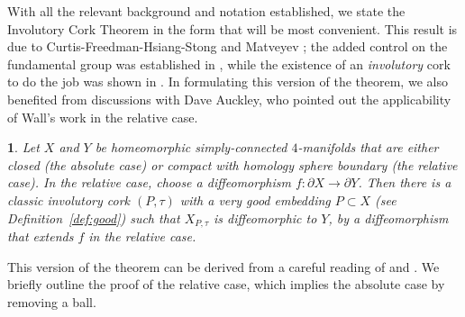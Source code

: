 \documentclass[11pt]{amsart}
\newcommand{\thistheoremname}{}
\newtheorem{genericthm}[theorem]{\thistheoremname}
\newenvironment{namedtheorem}[1]
  {\renewcommand{\thistheoremname}{#1}%
   \begin{genericthm}}
  {\end{genericthm}}
\theoremstyle{definition}
\newcommand{\defref}[1]{Definition~\ref{#1}}
\newcommand{\bj}{\mathbb J}
\newcommand{\bl}{\mathbb L}
\newcommand{\id}{\textup{id}}
\newcommand{\del}{\partial}
\newcommand{\ac}{\textup{AC}}
\newcommand{\bcs}{\mathop\natural}
\newcommand{\bsum}{C_1\bcs \cdots \bcs C_{n}}
\newcommand{\pw}{\textup{PW}}
\begin{document}

With all the relevant background and notation established, we state the Involutory Cork Theorem in the form that will be most convenient. This result is due to Curtis-Freedman-Hsiang-Stong \cite{curtis-freedman-hsiang-stong} and Matveyev \cite{matveyev}; the added control on the fundamental group was established in \cite{curtis-freedman-hsiang-stong}, while the existence of an {\sl involutory} cork to do the job was shown in \cite{matveyev}.  In formulating this version of the theorem, we also benefited from discussions with Dave Auckley, who pointed out the applicability of Wall's work \cite{wall:diffeomorphisms} in the relative case. 

\begin{namedtheorem}{Involutory Cork Theorem} \label{ICT}  
Let $X$ and $Y$ be homeomorphic simply-connected $4$-manifolds that are either closed \textup{(the absolute case)} or compact with homology sphere boundary \textup{(the relative case)}.  In the relative case, choose a diffeomorphism $f\colon\del X \to \del Y$.  Then there is a classic involutory cork $(P,\tau)$ 
with a very good embedding $P \subset X$ \textup{(see \defref{def:good})} such that $X_{P,\tau}$ is diffeomorphic to $Y$, by a diffeomorphism that extends $f$ in the relative case.
\end{namedtheorem}

This version of the theorem can be derived from a careful reading of \cite{curtis-freedman-hsiang-stong} and \cite{kirby:cork}.  We briefly outline the proof of the relative case, which implies the absolute case by removing a ball.  
\end{document}
